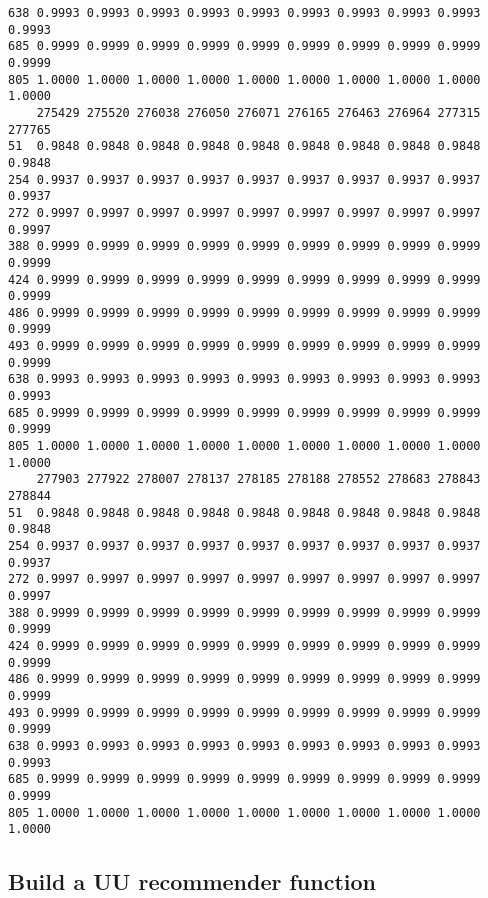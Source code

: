 \documentclass[
]{report}
\begin{document}
\begin{verbatim}
638 0.9993 0.9993 0.9993 0.9993 0.9993 0.9993 0.9993 0.9993 0.9993 0.9993
685 0.9999 0.9999 0.9999 0.9999 0.9999 0.9999 0.9999 0.9999 0.9999 0.9999
805 1.0000 1.0000 1.0000 1.0000 1.0000 1.0000 1.0000 1.0000 1.0000 1.0000
    275429 275520 276038 276050 276071 276165 276463 276964 277315 277765
51  0.9848 0.9848 0.9848 0.9848 0.9848 0.9848 0.9848 0.9848 0.9848 0.9848
254 0.9937 0.9937 0.9937 0.9937 0.9937 0.9937 0.9937 0.9937 0.9937 0.9937
272 0.9997 0.9997 0.9997 0.9997 0.9997 0.9997 0.9997 0.9997 0.9997 0.9997
388 0.9999 0.9999 0.9999 0.9999 0.9999 0.9999 0.9999 0.9999 0.9999 0.9999
424 0.9999 0.9999 0.9999 0.9999 0.9999 0.9999 0.9999 0.9999 0.9999 0.9999
486 0.9999 0.9999 0.9999 0.9999 0.9999 0.9999 0.9999 0.9999 0.9999 0.9999
493 0.9999 0.9999 0.9999 0.9999 0.9999 0.9999 0.9999 0.9999 0.9999 0.9999
638 0.9993 0.9993 0.9993 0.9993 0.9993 0.9993 0.9993 0.9993 0.9993 0.9993
685 0.9999 0.9999 0.9999 0.9999 0.9999 0.9999 0.9999 0.9999 0.9999 0.9999
805 1.0000 1.0000 1.0000 1.0000 1.0000 1.0000 1.0000 1.0000 1.0000 1.0000
    277903 277922 278007 278137 278185 278188 278552 278683 278843 278844
51  0.9848 0.9848 0.9848 0.9848 0.9848 0.9848 0.9848 0.9848 0.9848 0.9848
254 0.9937 0.9937 0.9937 0.9937 0.9937 0.9937 0.9937 0.9937 0.9937 0.9937
272 0.9997 0.9997 0.9997 0.9997 0.9997 0.9997 0.9997 0.9997 0.9997 0.9997
388 0.9999 0.9999 0.9999 0.9999 0.9999 0.9999 0.9999 0.9999 0.9999 0.9999
424 0.9999 0.9999 0.9999 0.9999 0.9999 0.9999 0.9999 0.9999 0.9999 0.9999
486 0.9999 0.9999 0.9999 0.9999 0.9999 0.9999 0.9999 0.9999 0.9999 0.9999
493 0.9999 0.9999 0.9999 0.9999 0.9999 0.9999 0.9999 0.9999 0.9999 0.9999
638 0.9993 0.9993 0.9993 0.9993 0.9993 0.9993 0.9993 0.9993 0.9993 0.9993
685 0.9999 0.9999 0.9999 0.9999 0.9999 0.9999 0.9999 0.9999 0.9999 0.9999
805 1.0000 1.0000 1.0000 1.0000 1.0000 1.0000 1.0000 1.0000 1.0000 1.0000
\end{verbatim}

\subsection{Build a UU recommender
function}\label{build-a-uu-recommender-function}
\end{document}
